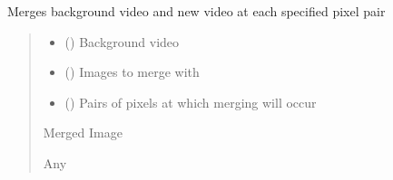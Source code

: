 \documentclass[letterpaper,10pt,english]{sphinxmanual}
\begin{document}
\begin{fulllineitems}
\label{\detokenize{Colorizer:Colorizer.merge_background}}
\pysigstartsignatures
{}
\pysigstopsignatures
\sphinxAtStartPar
Merges background video and new video at each specified pixel pair
\begin{quote}\begin{description}
\begin{itemize}
\item {} 
\sphinxAtStartPar
{} () \textendash{} Background video

\item {} 
\sphinxAtStartPar
{} () \textendash{} Images to merge with

\item {} 
\sphinxAtStartPar
{} (\sphinxstyleliteralemphasis{\sphinxupquote{{[}}}\sphinxstyleliteralemphasis{\sphinxupquote{{[}}}\sphinxstyleliteralemphasis{\sphinxupquote{,}}\sphinxstyleliteralemphasis{\sphinxupquote{{]}}}\sphinxstyleliteralemphasis{\sphinxupquote{{]}}}) \textendash{} Pairs of pixels at which merging will occur

\end{itemize}

\sphinxAtStartPar
Merged Image

\sphinxAtStartPar
Any

\end{description}\end{quote}

\end{fulllineitems}
\end{document}
